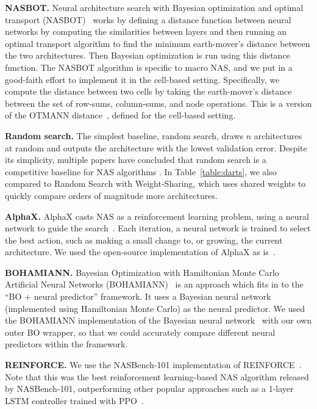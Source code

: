 \documentclass[11pt]{article}
\numberwithin{equation}{section}
\numberwithin{figure}{section}
\theoremstyle{plain}
\theoremstyle{definition}
\begin{document}
\textbf{NASBOT.}
Neural architecture search with Bayesian optimization 
and optimal transport (NASBOT)~\cite{nasbot} 
works by defining a distance function
between neural networks by computing the similarities between layers
and then running an optimal transport algorithm to find the minimum
earth-mover's distance between the two architectures.
Then Bayesian optimization is run using this distance function.
The NASBOT algorithm is specific to macro NAS, and we put in 
a good-faith effort to implement it in the cell-based setting.
Specifically, we compute the distance between two cells by taking
the earth-mover's distance between the set of row-sums, column-sums,
and node operations.
This is a version of the OTMANN distance~\cite{nasbot}, 
defined for the cell-based setting.

\textbf{Random search.} 
The simplest baseline, random search, draws $n$ architectures at
random and outputs the architecture with the lowest validation error.
Despite its simplicity, multiple papers have concluded that random search
is a competitive baseline for NAS algorithms \cite{randomnas, sciuto2019evaluating}.
In Table~\ref{table:darts}, we also compared to Random Search with Weight-Sharing,
which uses shared weights to quickly compare orders of magnitude more architectures. 

\textbf{AlphaX.}
AlphaX casts NAS as a reinforcement learning problem, using a neural network to
guide the search~\cite{alphax}.
Each iteration, a neural network is trained to select the best action,
such as making a small change to, or growing, the current architecture.
We used the open-source implementation of AlphaX as is~\cite{alphax}.

\textbf{BOHAMIANN.}
Bayesian Optimization with Hamiltonian Monte Carlo Artificial Neural Networks 
(BOHAMIANN)~\cite{springenberg2016bayesian}
is an approach which fits in to the ``BO + neural predictor'' framework.
It uses a Bayesian neural network (implemented using Hamiltonian Monte Carlo) as the
neural predictor. We used the BOHAMIANN implementation of the Bayesian neural 
network~\cite{springenberg2016bayesian} with our own outer BO wrapper, so that
we could accurately compare different neural predictors within the framework.


\textbf{REINFORCE.} 
We use the NASBench-101 implementation of REINFORCE~\cite{reinforce}.
Note that this was the best reinforcement learning-based NAS algorithm released by
NASBench-101, outperforming other popular approaches such as a
1-layer LSTM controller trained with PPO~\cite{nasbench}.
\end{document}
